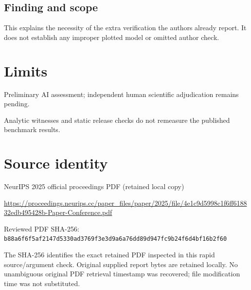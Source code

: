 \documentclass[11pt]{article}
\begin{document}
\subsection*{Finding and scope}

This explains the necessity of the extra verification the authors already report. It does not establish any improper plotted model or omitted author check.

\section*{Limits}

Preliminary AI assessment; independent human scientific adjudication remains pending.\par

Analytic witnesses and static release checks do not remeasure the published benchmark results.\par

\section*{Source identity}

NeurIPS 2025 official proceedings PDF (retained local copy)

\url{https://proceedings.neurips.cc/paper_files/paper/2025/file/4e1c9d5998c1f6ff618832edb495428b-Paper-Conference.pdf}

Reviewed PDF SHA-256: \nolinkurl{b88a6f6f5af2147d5330ad3769f3e3d9a6a76dd89d947fc9b24f6d4bf16b2f60}

The SHA-256 identifies the exact retained PDF inspected in this rapid source/argument check. Original supplied report bytes are retained locally. No unambiguous original PDF retrieval timestamp was recovered; file modification time was not substituted.
\end{document}
